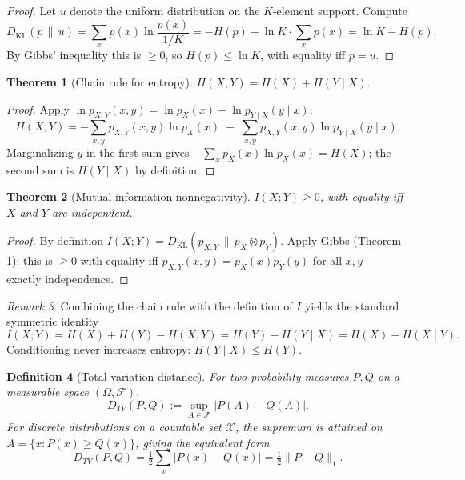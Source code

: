 \documentclass[11pt]{article}
\newtheorem{theorem}{Theorem}[section]
\newtheorem{definition}[theorem]{Definition}
\theoremstyle{remark}
\newtheorem{remark}[theorem]{Remark}
\begin{document}
\begin{proof}
Let $u$ denote the uniform distribution on the $K$-element support. Compute
\[
D_{\mathrm{KL}}(p \,\|\, u) = \sum_x p(x) \ln \frac{p(x)}{1/K} = -H(p) + \ln K \cdot \sum_x p(x) = \ln K - H(p).
\]
By Gibbs' inequality this is $\geq 0$, so $H(p) \leq \ln K$, with equality iff $p = u$.
\end{proof}

\begin{theorem}[Chain rule for entropy]
$H(X, Y) = H(X) + H(Y \mid X).$
\end{theorem}

\begin{proof}
Apply $\ln p_{X,Y}(x, y) = \ln p_X(x) + \ln p_{Y \mid X}(y \mid x)$:
\[
H(X, Y) = -\sum_{x,y} p_{X,Y}(x,y) \ln p_X(x) \;-\; \sum_{x,y} p_{X,Y}(x,y) \ln p_{Y \mid X}(y \mid x).
\]
Marginalizing $y$ in the first sum gives $-\sum_x p_X(x) \ln p_X(x) = H(X)$; the second sum is $H(Y \mid X)$ by definition.
\end{proof}

\begin{theorem}[Mutual information nonnegativity]
$I(X; Y) \geq 0$, with equality iff $X$ and $Y$ are independent.
\end{theorem}

\begin{proof}
By definition $I(X; Y) = D_{\mathrm{KL}}(p_{X,Y} \,\|\, p_X \otimes p_Y)$. Apply Gibbs (Theorem 1): this is $\geq 0$ with equality iff $p_{X,Y}(x, y) = p_X(x) p_Y(y)$ for all $x, y$ --- exactly independence.
\end{proof}

\begin{remark}
Combining the chain rule with the definition of $I$ yields the standard symmetric identity
\[
I(X; Y) = H(X) + H(Y) - H(X, Y) = H(Y) - H(Y \mid X) = H(X) - H(X \mid Y).
\]
Conditioning never increases entropy: $H(Y \mid X) \leq H(Y)$.
\end{remark}

\begin{definition}[Total variation distance]
\label{def:tv}
For two probability measures $P, Q$ on a measurable space $(\Omega, \mathcal{F})$,
\[
D_{TV}(P, Q) := \sup_{A \in \mathcal{F}} |P(A) - Q(A)|.
\]
For discrete distributions on a countable set $\mathcal{X}$, the supremum is attained on $A = \{x : P(x) \ge Q(x)\}$, giving the equivalent form
\[
D_{TV}(P, Q) = \tfrac{1}{2} \sum_{x} |P(x) - Q(x)| = \tfrac{1}{2}\|P - Q\|_1.
\]
\end{definition}
\end{document}
